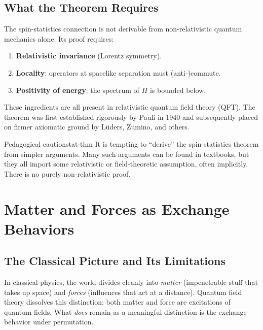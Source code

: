 \documentclass[11pt,a4paper]{article}
\begin{document}
\subsection{What the Theorem Requires}

The spin-statistics connection is not derivable from non-relativistic quantum
mechanics alone.  Its proof requires:
\begin{enumerate}
  \item \textbf{Relativistic invariance} (Lorentz symmetry).
  \item \textbf{Locality}: operators at spacelike separation must (anti-)commute.
  \item \textbf{Positivity of energy}: the spectrum of $H$ is bounded below.
\end{enumerate}
These ingredients are all present in relativistic quantum field theory (QFT).
The theorem was first established rigorously by Pauli in 1940 and subsequently
placed on firmer axiomatic ground by Lüders, Zumino, and others.

\begin{rem}{Pedagogical caution}{stat-thm}
  It is tempting to ``derive'' the spin-statistics theorem from simpler
  arguments.  Many such arguments can be found in textbooks, but they all
  import some relativistic or field-theoretic assumption, often implicitly.
  There is no purely non-relativistic proof.
\end{rem}

\section{Matter and Forces as Exchange Behaviors}

\subsection{The Classical Picture and Its Limitations}

In classical physics, the world divides cleanly into \emph{matter}
(impenetrable stuff that takes up space) and \emph{forces} (influences that act
at a distance).  Quantum field theory dissolves this distinction: both matter
and force are excitations of quantum fields.  What \emph{does} remain as a
meaningful distinction is the exchange behavior under permutation.
\end{document}
